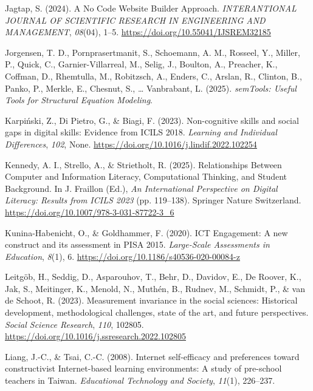 \documentclass[
  letterpaper,
  DIV=11,
  numbers=noendperiod]{scrartcl}
\newlength{\cslhangindent}
\newenvironment{CSLReferences}[2] %
 {\begin{list}{}{%
  \setlength{\itemindent}{0pt}
  \setlength{\leftmargin}{0pt}
  \setlength{\parsep}{0pt}
  \ifodd #1
   \setlength{\leftmargin}{\cslhangindent}
   \setlength{\itemindent}{-1\cslhangindent}
  \fi
  \setlength{\itemsep}{#2\baselineskip}}}
 {\end{list}}
\begin{document}
\begin{CSLReferences}{1}{0}
Jagtap, S. (2024). A {No Code Website Builder Approach}.
\emph{INTERANTIONAL JOURNAL OF SCIENTIFIC RESEARCH IN ENGINEERING AND
MANAGEMENT}, \emph{08}(04), 1--5.
\url{https://doi.org/10.55041/IJSREM32185}

Jorgensen, T. D., Pornprasertmanit, S., Schoemann, A. M., Rosseel, Y.,
Miller, P., Quick, C., Garnier-Villarreal, M., Selig, J., Boulton, A.,
Preacher, K., Coffman, D., Rhemtulla, M., Robitzsch, A., Enders, C.,
Arslan, R., Clinton, B., Panko, P., Merkle, E., Chesnut, S., \ldots{}
Vanbrabant, L. (2025). \emph{{semTools}: {Useful Tools} for {Structural
Equation Modeling}}.

Karpiński, Z., Di Pietro, G., \& Biagi, F. (2023). Non-cognitive skills
and social gaps in digital skills: {Evidence} from {ICILS} 2018.
\emph{Learning and Individual Differences}, \emph{102}, None.
\url{https://doi.org/10.1016/j.lindif.2022.102254}

Kennedy, A. I., Strello, A., \& Strietholt, R. (2025). Relationships
{Between Computer} and {Information Literacy}, {Computational Thinking},
and {Student Background}. In J. Fraillon (Ed.), \emph{An {International
Perspective} on {Digital Literacy}: {Results} from {ICILS} 2023} (pp.
119--138). Springer Nature Switzerland.
\url{https://doi.org/10.1007/978-3-031-87722-3_6}

Kunina-Habenicht, O., \& Goldhammer, F. (2020). {ICT Engagement}: A new
construct and its assessment in {PISA} 2015. \emph{Large-Scale
Assessments in Education}, \emph{8}(1), 6.
\url{https://doi.org/10.1186/s40536-020-00084-z}

Leitgöb, H., Seddig, D., Asparouhov, T., Behr, D., Davidov, E., De
Roover, K., Jak, S., Meitinger, K., Menold, N., Muthén, B., Rudnev, M.,
Schmidt, P., \& van de Schoot, R. (2023). Measurement invariance in the
social sciences: {Historical} development, methodological challenges,
state of the art, and future perspectives. \emph{Social Science
Research}, \emph{110}, 102805.
\url{https://doi.org/10.1016/j.ssresearch.2022.102805}

Liang, J.-C., \& Tsai, C.-C. (2008). Internet self-efficacy and
preferences toward constructivist {Internet-based} learning
environments: {A} study of pre-school teachers in {Taiwan}.
\emph{Educational Technology and Society}, \emph{11}(1), 226--237.


\end{CSLReferences}
\end{document}
